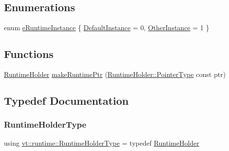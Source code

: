 \subsection*{Enumerations}
\begin{DoxyCompactItemize}
\item 
enum \hyperlink{namespacevt_1_1runtime_afca910c1b38b3975f7c1da8001a77d58}{e\+Runtime\+Instance} \{ \hyperlink{namespacevt_1_1runtime_afca910c1b38b3975f7c1da8001a77d58af4b803eff3cdc140ed473828f9c89101}{Default\+Instance} = 0, 
\hyperlink{namespacevt_1_1runtime_afca910c1b38b3975f7c1da8001a77d58af541bede5bc84a16357c26d30a508ff4}{Other\+Instance} = 1
 \}
\end{DoxyCompactItemize}
\subsection*{Functions}
\begin{DoxyCompactItemize}
\item 
\hyperlink{structvt_1_1runtime_1_1_runtime_holder}{Runtime\+Holder} \hyperlink{namespacevt_1_1runtime_a71998fecf2a4d70b11e3ae4aa47810db}{make\+Runtime\+Ptr} (\hyperlink{structvt_1_1runtime_1_1_runtime_holder_a9740e8aa7487fcf38b67a7e160d7b046}{Runtime\+Holder\+::\+Pointer\+Type} const ptr)
\end{DoxyCompactItemize}


\subsection{Typedef Documentation}
\mbox{\label{namespacevt_1_1runtime_ab09d044cce417fbcdb7e1e29b7aabbc3}} 
\subsubsection{\texorpdfstring{Runtime\+Holder\+Type}{RuntimeHolderType}}
{\footnotesize\ttfamily using \hyperlink{namespacevt_1_1runtime_ab09d044cce417fbcdb7e1e29b7aabbc3}{vt\+::runtime\+::\+Runtime\+Holder\+Type} = typedef \hyperlink{structvt_1_1runtime_1_1_runtime_holder}{Runtime\+Holder}}

\mbox{\label{namespacevt_1_1runtime_a69931905b04961a874e4a70a43083a83}} 
